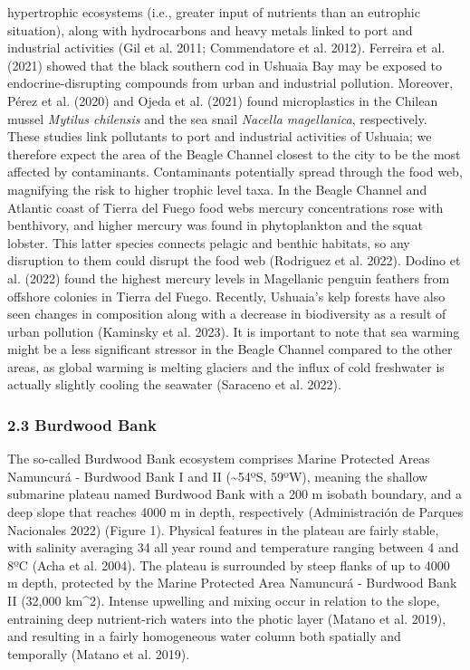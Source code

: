 \documentclass[
]{article}
\begin{document}
hypertrophic ecosystems (i.e., greater input of nutrients than an
eutrophic situation), along with hydrocarbons and heavy metals linked to
port and industrial activities (Gil et al. 2011; Commendatore et al.
2012). Ferreira et al. (2021) showed that the black southern cod in
Ushuaia Bay may be exposed to endocrine-disrupting compounds from urban
and industrial pollution. Moreover, Pérez et al. (2020) and Ojeda et al.
(2021) found microplastics in the Chilean mussel \emph{Mytilus
chilensis} and the sea snail \emph{Nacella magellanica}, respectively.
These studies link pollutants to port and industrial activities of
Ushuaia; we therefore expect the area of the Beagle Channel closest to
the city to be the most affected by contaminants. Contaminants
potentially spread through the food web, magnifying the risk to higher
trophic level taxa. In the Beagle Channel and Atlantic coast of Tierra
del Fuego food webs mercury concentrations rose with benthivory, and
higher mercury was found in phytoplankton and the squat lobster. This
latter species connects pelagic and benthic habitats, so any disruption
to them could disrupt the food web (Rodriguez et al. 2022). Dodino et
al. (2022) found the highest mercury levels in Magellanic penguin
feathers from offshore colonies in Tierra del Fuego. Recently, Ushuaia's
kelp forests have also seen changes in composition along with a decrease
in biodiversity as a result of urban pollution (Kaminsky et al. 2023).
It is important to note that sea warming might be a less significant
stressor in the Beagle Channel compared to the other areas, as global
warming is melting glaciers and the influx of cold freshwater is
actually slightly cooling the seawater (Saraceno et al. 2022).

\subsubsection{2.3 Burdwood Bank}\label{burdwood-bank}

The so-called Burdwood Bank ecosystem comprises Marine Protected Areas
Namuncurá - Burdwood Bank I and II (\textasciitilde54ºS, 59ºW), meaning
the shallow submarine plateau named Burdwood Bank with a 200 m isobath
boundary, and a deep slope that reaches 4000 m in depth, respectively
(Administración de Parques Nacionales 2022) (Figure 1). Physical
features in the plateau are fairly stable, with salinity averaging 34
all year round and temperature ranging between 4 and 8ºC (Acha et al.
2004). The plateau is surrounded by steep flanks of up to 4000 m depth,
protected by the Marine Protected Area Namuncurá - Burdwood Bank II
(32,000 km\^{}2). Intense upwelling and mixing occur in relation to the
slope, entraining deep nutrient-rich waters into the photic layer
(Matano et al. 2019), and resulting in a fairly homogeneous water column
both spatially and temporally (Matano et al. 2019).
\end{document}
